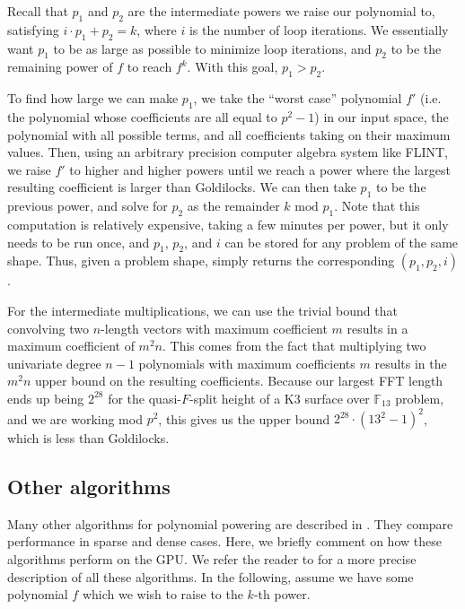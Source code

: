 Recall that $p_1$ and $p_2$ are the intermediate powers we raise our 
polynomial to, satisfying $i \cdot p_1 + p_2 = k$, where $i$ is the 
number of loop iterations. We essentially want $p_1$ to be as large 
as possible to minimize loop iterations, and $p_2$ to be the remaining 
power of $f$ to reach $f^k$. With this goal, $p_1 > p_2$.

To find how large we can make $p_1$, we take the ``worst case'' 
polynomial $f'$ (i.e. the polynomial whose coefficients are all equal to \(p^{2}-1\)) in our input space, the polynomial with all possible 
terms, and all coefficients taking on their maximum values. Then, using 
an arbitrary precision computer algebra system like FLINT, 
we raise $f'$ to higher and higher powers 
until we reach a power where the largest resulting coefficient is 
larger than Goldilocks. We can then take $p_1$ to be the previous 
power, and solve for $p_2$ as the remainder 
\(k \text{ mod } p_{1}\).
Note that this computation is relatively expensive, 
taking a few minutes per power, but it only needs to be run once, and 
$p_1$, $p_2$, and $i$ can be stored for any problem of the same shape.
Thus, given a problem shape,  simply returns the 
corresponding $(p_1, p_2, i)$.

For the intermediate multiplications, we can use the trivial 
bound that convolving two 
$n$-length vectors with maximum coefficient $m$ results in a maximum 
coefficient of $m^2n$. This comes from the fact that 
multiplying two univariate degree $n-1$ polynomials with maximum
coefficients $m$ results in the $m^2n$ upper bound on the resulting 
coefficients. Because our largest 
FFT length ends up being $2^{28}$ for the quasi-$F$-split height of a 
K3 surface over $\mathbb{F}_{13}$ problem, and we are working mod $p^2$,
this gives us the upper bound $2^{28} \cdot (13^2 - 1)^2$, which is less than
Goldilocks.

\subsection{Other algorithms} \label{sec:poly:other}

Many other algorithms 
for polynomial powering
are described in \cite{monagan-2012-sparse-powering}. 
They compare performance in sparse and dense cases. 
Here, we briefly comment on how these algorithms perform on the GPU.
We refer the reader to \cite{monagan-2012-sparse-powering}
for a more precise description of all these algorithms.
In the following, assume we have some polynomial \(f\) which we wish 
to raise to the \(k\)-th power.

